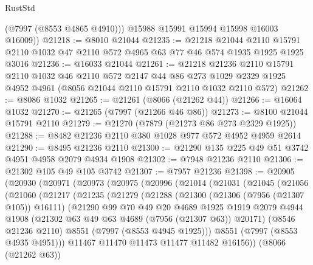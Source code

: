 \begin{lexlean}{RustStd}
\begin{coremodule}
          (@7997 (@8553 @4865 @4910)))
        @15988
        @15991
        @15994
        @15998
        @16003
        @16009))
@21218 := @8010 @21044
@21235 := @21218
    @21044
    @2110
    @15791
    @2110
    @1032
    @47
    @2110
    @572
    @4965
    @63
    @77
    @46
    @574
    @1935
    @1925
    @1925
    @3016
@21236 := @16033 @21044
@21261 := @21218
    @21236
    @2110
    @15791
    @2110
    @1032
    @46
    @2110
    @572
    @2147
    @44
    @86
    @273
    @1029
    @2329
    @1925
    @4952
    @4961
    (@8056 @21044 @2110 @15791 @2110 @1032 @2110 @572)
@21262 := @8086 @1032
@21265 := @21261 (@8066 (@21262 @44))
@21266 := @16064 @1032
@21270 := @21265 (@7997 (@21266 @46 @86))
@21273 := @8100 @21044 @15791 @2110
@21279 := @21270 (@7879 (@21273 @86 @273 @2329 @1925))
@21288 := @8482 @21236 @2110 @380 @1028 @977 @572 @4952 @4959 @2614
@21290 := @8495 @21236 @2110
@21300 := @21290 @135 @225 @49 @51 @3742 @4951 @4958 @2079 @4934 @1908
@21302 := @7948 @21236 @2110
@21306 := @21302 @105 @49 @105 @3742
@21307 := @7957 @21236
@21398 := @20905
    (@20930
      (@20971
        (@20973
          (@20975
            (@20996
              (@21014
                (@21031
                  (@21045
                    (@21056
                      (@21060
                        (@21217
                          (@21235
                            (@21279
                              (@21288
                                (@21300
                                  (@21306 (@7956 (@21307 @105)) @16111)
                                  (@21290
                                    @99
                                    @70
                                    @49
                                    @20
                                    @4689
                                    @1925
                                    @1919
                                    @2079
                                    @4944
                                    @1908
                                    (@21302 @63 @49 @63 @4689 (@7956 (@21307 @63)) @20171)
                                    (@8546 @21236 @2110)
                                    @8551
                                    (@7997 (@8553 @4945 @1925)))
                                  @8551
                                  (@7997 (@8553 @4935 @4951)))
                                @11467
                                @11470
                                @11473
                                @11477
                                @11482
                                @16156))
                            (@8066 (@21262 @63))

\end{coremodule}
\end{lexlean}
